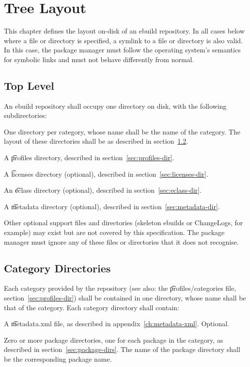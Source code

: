 \chapter{Tree Layout}

This chapter defines the layout on-disk of an ebuild repository. In all cases below where a file or
directory is specified, a symlink to a file or directory is also valid. In this case, the package
manager must follow the operating system's semantics for symbolic links and must not behave
differently from normal.

\section{Top Level}

An ebuild repository shall occupy one directory on disk, with the following subdirectories:
\nobreakpar
\begin{compactitem}
\item One directory per category, whose name shall be the name of the category. The layout of
    these directories shall be as described in section~\ref{sec:category-dirs}.
\item A \t{profiles} directory, described in section~\ref{sec:profiles-dir}.
\item A \t{licenses} directory (optional), described in section~\ref{sec:licenses-dir}.
\item An \t{eclass} directory (optional), described in section~\ref{sec:eclass-dir}.
\item A \t{metadata} directory (optional), described in section~\ref{sec:metadata-dir}.
\item Other optional support files and directories (skeleton ebuilds or ChangeLogs,
    for example) may exist but are not covered by this specification. The package manager must
    ignore any of these files or directories that it does not recognise.

\end{compactitem}

\section{Category Directories}
\label{sec:category-dirs}

Each category provided by the repository (see also: the \t{profiles/categories} file,
section~\ref{sec:profiles-dir}) shall be contained in one directory, whose name shall be that of
the category. Each category directory shall contain:
\begin{compactitem}
\item A \t{metadata.xml} file, as described in appendix~\ref{ch:metadata-xml}\@. Optional.
\item Zero or more package directories, one for each package in the category, as described in
    section~\ref{sec:package-dirs}. The name of the package directory shall be the corresponding
    package name.
\end{compactitem}

